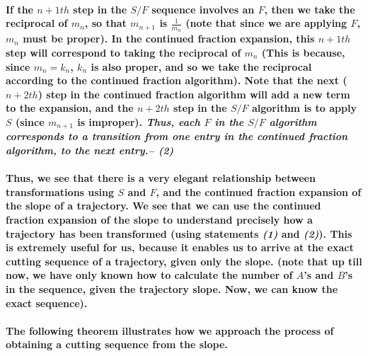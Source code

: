 \documentclass{report}
\begin{document}
\paragraph{If the $n+1th$ step in the $S/F$ sequence involves an $F$, then we take the reciprocal of $m_n$, so that $m_{n+1}$ is $\frac{1}{m_n}$ (note that since we are applying $F$, $m_n$ must be proper). In the continued fraction expansion, this $n+1th$ step will correspond to taking the reciprocal of $m_n$ (This is because, since $m_n = k_n$, $k_n$ is also proper, and so we take the reciprocal according to the continued fraction algorithm). Note that the next ($n+2th$) step in the continued fraction algorithm will add a new term to the expansion, and the $n+2th$ step in the $S/F$ algorithm is to apply $S$ (since $m_{n+1}$ is improper). \textit{Thus, each $F$ in the $S/F$ algorithm corresponds to a transition from one entry in the continued fraction algorithm, to the next entry.-- (2)}}

\paragraph{Thus, we see that there is a very elegant relationship between transformations using $S$ and $F$, and the continued fraction expansion of the slope of a trajectory. We see that we can use the continued fraction expansion of the slope to understand precisely how a trajectory has been transformed (using statements \textit{(1)} and \textit{(2)}). This is extremely useful for us, because it enables us to arrive at the exact cutting sequence of a trajectory, given only the slope.  (note that up till now, we have only known how to calculate the number of $A$’s and $B$’s in the sequence, given the trajectory slope. Now, we can know the exact sequence).}

\paragraph{The following theorem illustrates how we approach the process of obtaining a cutting sequence from the slope.}
\end{document}
